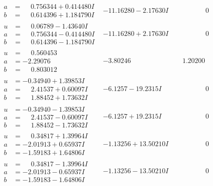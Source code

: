 \documentclass[1p]{elsarticle_modified}
\theoremstyle{definition}
\begin{document}
$$\begin{array}{c|c|c}
\begin{aligned}
a &= \phantom{-}0.756344 + 0.414480 I \\
b &= \phantom{-}0.614396 + 1.184790 I\end{aligned}
 & -11.16280 - 2.17630 I & \phantom{-0.000000 } 0 \\ \hline\begin{aligned}
u &= \phantom{-}0.06789 - 1.43640 I \\
a &= \phantom{-}0.756344 - 0.414480 I \\
b &= \phantom{-}0.614396 - 1.184790 I\end{aligned}
 & -11.16280 + 2.17630 I & \phantom{-0.000000 } 0 \\ \hline\begin{aligned}
u &= \phantom{-}0.560453\phantom{ +0.000000I} \\
a &= -2.29076\phantom{ +0.000000I} \\
b &= \phantom{-}0.803012\phantom{ +0.000000I}\end{aligned}
 & -3.80246\phantom{ +0.000000I} & \phantom{-}1.20200\phantom{ +0.000000I} \\ \hline\begin{aligned}
u &= -0.34940 + 1.39853 I \\
a &= \phantom{-}2.41537 + 0.60097 I \\
b &= \phantom{-}1.88452 + 1.73632 I\end{aligned}
 & -6.1257 - 19.2315 I & \phantom{-0.000000 } 0 \\ \hline\begin{aligned}
u &= -0.34940 - 1.39853 I \\
a &= \phantom{-}2.41537 - 0.60097 I \\
b &= \phantom{-}1.88452 - 1.73632 I\end{aligned}
 & -6.1257 + 19.2315 I & \phantom{-0.000000 } 0 \\ \hline\begin{aligned}
u &= \phantom{-}0.34817 + 1.39964 I \\
a &= -2.01913 + 0.65937 I \\
b &= -1.59183 + 1.64806 I\end{aligned}
 & -1.13256 + 13.50210 I & \phantom{-0.000000 } 0 \\ \hline\begin{aligned}
u &= \phantom{-}0.34817 - 1.39964 I \\
a &= -2.01913 - 0.65937 I \\
b &= -1.59183 - 1.64806 I\end{aligned}
 & -1.13256 - 13.50210 I & \phantom{-0.000000 } 0\\

\end{array}$$
\end{document}
